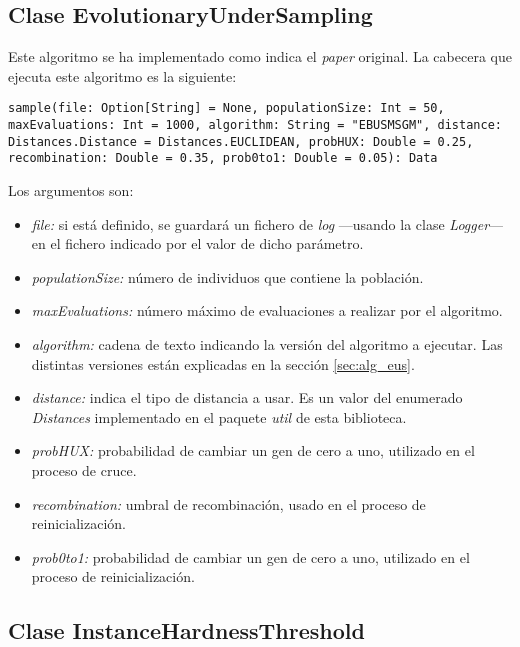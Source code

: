 \subsection{Clase EvolutionaryUnderSampling} \label{subsec:impl_evolutionaryundersampling}

Este algoritmo se ha implementado como indica el \textit{paper} original. La cabecera que ejecuta este algoritmo es la siguiente:

\begin{lstlisting}[frame=single, basicstyle=\scriptsize, breaklines=true]
sample(file: Option[String] = None, populationSize: Int = 50, maxEvaluations: Int = 1000, algorithm: String = "EBUSMSGM", distance: Distances.Distance = Distances.EUCLIDEAN, probHUX: Double = 0.25, recombination: Double = 0.35, prob0to1: Double = 0.05): Data
\end{lstlisting}

Los argumentos son:

\begin{itemize}
    \item \textit{file:} si está definido, se guardará un fichero de \textit{log} —usando la clase \textit{Logger}— en el fichero indicado por el valor de dicho parámetro.
    \item \textit{populationSize:} número de individuos que contiene la población.
    \item \textit{maxEvaluations:} número máximo de evaluaciones a realizar por el algoritmo.
    \item \textit{algorithm:} cadena de texto indicando la versión del algoritmo a ejecutar. Las distintas versiones están explicadas en la sección \ref{sec:alg_eus}.
    \item \textit{distance:} indica el tipo de distancia a usar. Es un valor del enumerado \textit{Distances} implementado en el paquete \textit{util} de esta biblioteca.
    \item \textit{probHUX:} probabilidad de cambiar un gen de cero a uno, utilizado en el proceso de cruce.
    \item \textit{recombination:} umbral de recombinación, usado en el proceso de reinicialización.
    \item \textit{prob0to1:} probabilidad de cambiar un gen de cero a uno, utilizado en el proceso de reinicialización.
\end{itemize}

\subsection{Clase InstanceHardnessThreshold} \label{subsec:impl_instancehardnessthreshold}


